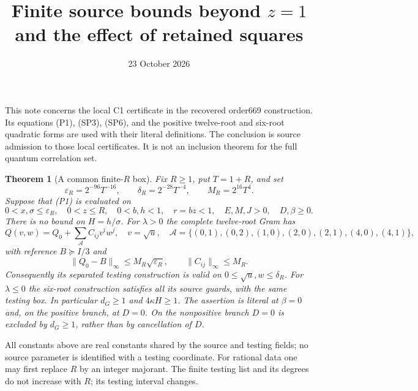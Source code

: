 \documentclass[11pt]{article}
\newtheorem{theorem}{Theorem}
\newcommand{\eps}{\varepsilon}
\newcommand{\sigs}{\sigma}
\begin{document}
\title{Finite source bounds beyond $z=1$ and the effect of retained squares}
\author{}\date{23 October 2026}\maketitle

This note concerns the local C1 certificate in the recovered order669
construction. Its equations (P1), (SP3), (SP6), and the positive twelve-root
and six-root quadratic forms are used with their literal definitions.
The conclusion is source admission to those local certificates. It is
not an inclusion theorem for the full quantum correlation set.

\begin{theorem}[A common finite-$R$ box]\label{thm:R}
Fix $R\ge1$, put $T=1+R$, and set
\[
 \eps_R=2^{-96}T^{-16},\qquad
 \delta_R=2^{-28}T^{-4},\qquad M_R=2^{16}T^4.
\]
Suppose that (P1) is evaluated on
\[
 0<x,\sigs\le\eps_R,\quad 0<z\le R,\quad
 0<b,h<1,\quad r=bz<1,\quad E,M,J>0,\quad D,\beta\ge0.
\]
There is no bound on $H=h/\sigs$.
For $\lambda>0$ the complete twelve-root Gram has
\[
 Q(v,w)=Q_0+\sum_{\mathcal A}C_{ij}v^iw^j,
 \quad v=\sqrt u,\quad
 \mathcal A=\{(0,1),(0,2),(1,0),(2,0),(2,1),(4,0),(4,1)\},
\]
with reference $B\succeq I/3$ and
\begin{equation}\label{eq:mainbounds}
 \|Q_0-B\|_\infty\le M_R\sqrt{\eps_R},\qquad
 \|C_{ij}\|_\infty\le M_R.
\end{equation}
Consequently its separated testing construction is valid on
$0\le\sqrt u,w\le\delta_R$.
For $\lambda\le0$ the six-root construction satisfies all its source
guards, with the same testing box. In particular $d_G\ge1$ and
$4\kappa H\ge1$. The assertion is literal at $\beta=0$ and, on the
positive branch, at $D=0$. On the nonpositive branch $D=0$ is excluded by
$d_G\ge1$, rather than by cancellation of $D$.
\end{theorem}

All constants above are real constants shared by the source and testing
fields; no source parameter is identified with a testing coordinate.
For rational data one may first replace $R$ by an integer majorant.
The finite testing list and its degrees do not increase with $R$;
its testing interval changes.
\end{document}
